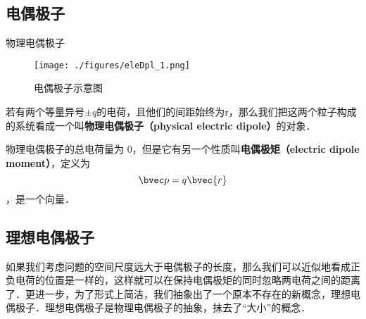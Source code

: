 


\subsection{电偶极子}



\begin{definition}{物理电偶极子}
\begin{figure}[ht]
\centering
\texttt{[image: ./figures/eleDpl\_1.png]}
\caption{电偶极子示意图} \label{eleDpl_fig1}
\end{figure}
若有两个等量异号$\pm q$的电荷，且他们的间距始终为r，那么我们把这两个粒子构成的系统看成一个叫\textbf{物理电偶极子（physical electric dipole）}的对象．

物理电偶极子的总电荷量为 $0$，但是它有另一个性质叫\textbf{电偶极矩（electric dipole moment）}，定义为 
\begin{equation}
\bvec p = q\bvec{r}
\end{equation}
，是一个向量．
\end{definition}

\subsection{理想电偶极子}
如果我们考虑问题的空间尺度远大于电偶极子的长度，那么我们可以近似地看成正负电荷的位置是一样的，这样就可以在保持电偶极矩的同时忽略两电荷之间的距离了．更进一步，为了形式上简洁，我们抽象出了一个原本不存在的新概念，理想电偶极子．理想电偶极子是物理电偶极子的抽象，抹去了“大小”的概念．


